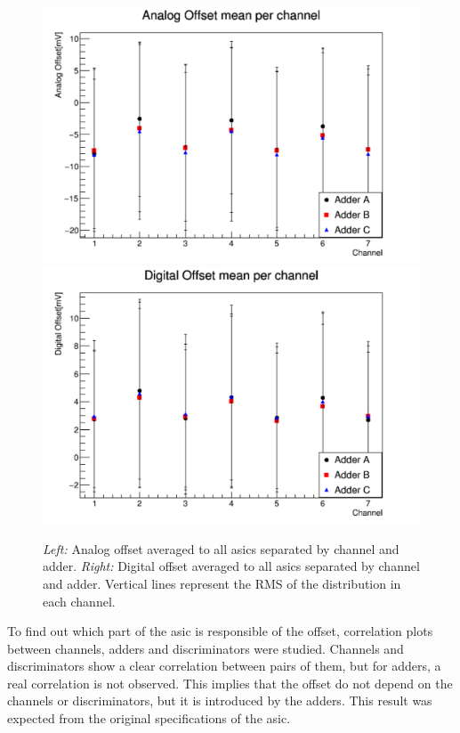 \documentclass[main.tex]{subfiles}
\begin{document}
\begin{figure}[h]
  \centering
  \includegraphics[width=\textwidth]{./Pictures/analogch.pdf}
  \endminipage
  \includegraphics[width=\textwidth]{./Pictures/digitalch.pdf}
  \endminipage
  \caption{\textit{Left:} Analog offset averaged to all \glspl{asic} separated by channel and adder. \textit{Right:} Digital offset averaged to all \glspl{asic} separated by channel and adder. Vertical lines represent the RMS of the distribution in each channel.}
  \label{fig:offch}
\end{figure}

To find out which part of the \gls{asic} is responsible of the offset, correlation plots between channels, adders and discriminators were studied. Channels and discriminators show a clear correlation between pairs of them, but for adders, a real correlation is not observed. This implies that the offset do not depend on the channels or discriminators, but it is introduced by the adders. This result was expected from the original specifications of the \gls{asic}.
\end{document}
